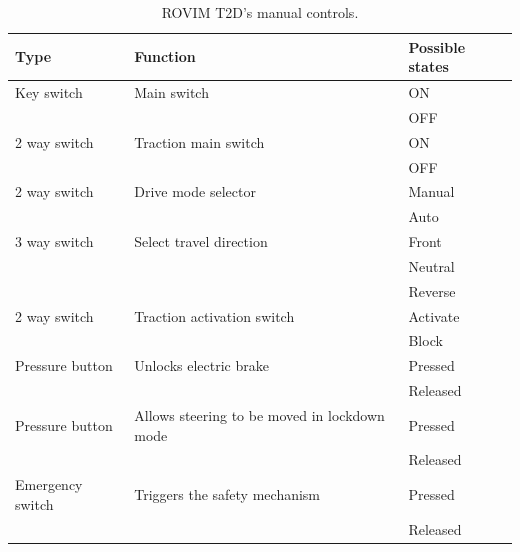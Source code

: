 \documentclass[journal]{IEEEtran}
\begin{document}

\begin{table}[!t]
    \renewcommand{\arraystretch}{1.3}
    \caption{ROVIM T2D's manual controls.}
    \label{tab:hwinputs}
    \centering
    \begin{tabular} {@{} m{} m{} m{} @{}}
        \hline%
        Type & Function & Possible states\\
        \hline%
        Key switch & Main switch & ON\\&&OFF\\%
        2 way switch & Traction main switch & ON\\&&OFF\\
        2 way switch & Drive mode selector & Manual\\&&Auto\\
        3 way switch & Select travel direction \footnotemark[1]& Front\\&&Neutral\\&&Reverse\\
        2 way switch & Traction activation switch \footnotemark[1]& Activate\\&&Block\\
        Pressure button & Unlocks electric brake & Pressed\\&&Released\\
        Pressure button & Allows steering to be moved in lockdown mode & Pressed\\&&Released\\
        Emergency switch & Triggers the safety mechanism & Pressed\\&&Released\\ 

\end{tabular}
\end{table}
\end{document}
